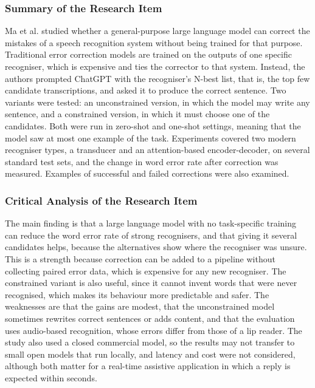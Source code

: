 \documentclass{FastFyp}
\begin{document}
\subsubsection*{Summary of the Research Item}
Ma et al. \cite{ma2025llmasr} studied whether a general-purpose large language model can correct the mistakes of a speech recognition system without being trained for that purpose. Traditional error correction models are trained on the outputs of one specific recogniser, which is expensive and ties the corrector to that system. Instead, the authors prompted ChatGPT with the recogniser's N-best list, that is, the top few candidate transcriptions, and asked it to produce the correct sentence. Two variants were tested: an unconstrained version, in which the model may write any sentence, and a constrained version, in which it must choose one of the candidates. Both were run in zero-shot and one-shot settings, meaning that the model saw at most one example of the task. Experiments covered two modern recogniser types, a transducer and an attention-based encoder-decoder, on several standard test sets, and the change in word error rate after correction was measured. Examples of successful and failed corrections were also examined.

\subsubsection*{Critical Analysis of the Research Item}
The main finding is that a large language model with no task-specific training can reduce the word error rate of strong recognisers, and that giving it several candidates helps, because the alternatives show where the recogniser was unsure. This is a strength because correction can be added to a pipeline without collecting paired error data, which is expensive for any new recogniser. The constrained variant is also useful, since it cannot invent words that were never recognised, which makes its behaviour more predictable and safer. The weaknesses are that the gains are modest, that the unconstrained model sometimes rewrites correct sentences or adds content, and that the evaluation uses audio-based recognition, whose errors differ from those of a lip reader. The study also used a closed commercial model, so the results may not transfer to small open models that run locally, and latency and cost were not considered, although both matter for a real-time assistive application in which a reply is expected within seconds.
\end{document}
